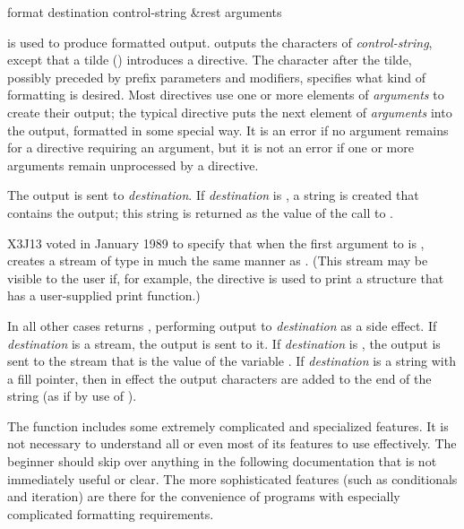 \begin{defun}[Function]
format destination control-string &rest arguments

 is used to produce formatted output.
 outputs the characters of \emph{control-string},
except that a tilde (\cd{{\Xtilde}}) introduces a directive.
The character after
the tilde, possibly preceded by prefix parameters and modifiers, specifies
what kind of formatting is desired.  Most directives use one or more
elements of \emph{arguments} to create their output; the typical directive
puts the next element of \emph{arguments} into the output, formatted in
some special way.  It is an error if no argument remains for a directive
requiring an argument, but it is not an error if one or more arguments
remain unprocessed by a directive.

The output is sent to \emph{destination}.  If \emph{destination} is
{\false}, a string is created that contains the output; this string is
returned as the value of the call to .

\begin{new}
X3J13 voted in January 1989
to specify that when the first argument
to  is ,  creates a stream
of type  in much the same manner as .
(This stream may be visible to the user if, for example, the 
directive is used to print a  structure that has a user-supplied
print function.)
\end{new}

In all other cases
 returns {\false}, performing output to \emph{destination}
as a side effect.
If \emph{destination} is a stream, the output is sent to it.  If
\emph{destination} is {\true}, the output is sent to the stream
that is the value of the variable .
If \emph{destination} is a string with a fill pointer, then
in effect the output characters are added to the end of the string
(as if by use of ).

The  function includes some extremely complicated and specialized
features.  It is not necessary to understand all or even most of its
features to use  effectively.  The beginner should
skip over anything in the following documentation that is not
immediately useful or clear.  The more sophisticated features
(such as conditionals and iteration) are
there for the convenience of programs with especially complicated formatting
requirements.


\end{defun}

